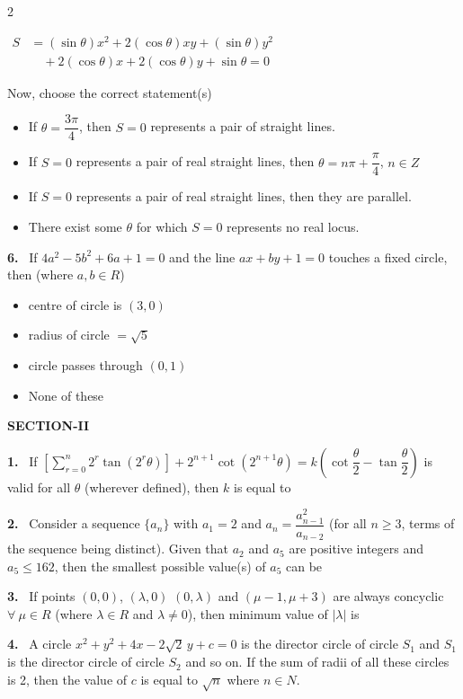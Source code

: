 \documentclass[10pt]{extarticle}
\newcommand{\sect}[1]{\par\smallskip\noindent\textbf{#1}\par}
\newcommand{\qn}[1]{\par\smallskip\noindent\textbf{#1.}~}
\newenvironment{qoptions}{\begin{itemize}[leftmargin=1.8em,itemsep=1pt,topsep=2pt,label={}]}{\end{itemize}}
\newcommand{\opt}[2]{\item[(#1)] #2}
\begin{document}
\begin{multicols}{2}
\par\noindent\hfill$\begin{aligned}S&=(\sin\theta)x^2+2(\cos\theta)xy+(\sin\theta)y^2\\&\quad+2(\cos\theta)x+2(\cos\theta)y+\sin\theta=0\end{aligned}$\hfill\null\par
Now, choose the correct statement(s)
\begin{qoptions}
\opt{A}{If $\theta=\dfrac{3\pi}4$, then $S=0$ represents a pair of straight lines.}
\opt{B}{If $S=0$ represents a pair of real straight lines, then $\theta=n\pi+\dfrac\pi4$, $n\in Z$}
\opt{C}{If $S=0$ represents a pair of real straight lines, then they are parallel.}
\opt{D}{There exist some $\theta$ for which $S=0$ represents no real locus.}
\end{qoptions}
\qn{6} If $4a^2-5b^2+6a+1=0$ and the line $ax+by+1=0$ touches a fixed circle, then (where $a,b\in R$)
\begin{qoptions}
\opt{A}{centre of circle is $(3,0)$}
\opt{B}{radius of circle $=\sqrt5$}
\opt{C}{circle passes through $(0,1)$}
\opt{D}{None of these}
\end{qoptions}
\sect{SECTION-II}
\qn{1} If $\left[\displaystyle\sum_{r=0}^{n}2^r\tan\left(2^r\theta\right)\right]+2^{n+1}\cot\left(2^{n+1}\theta\right)=k\left(\cot\dfrac\theta2-\tan\dfrac\theta2\right)$ is valid for all $\theta$ (wherever defined), then $k$ is equal to
\qn{2} Consider a sequence $\{a_n\}$ with $a_1=2$ and $a_n=\dfrac{a_{n-1}^2}{a_{n-2}}$ (for all $n\ge3$, terms of the sequence being distinct). Given that $a_2$ and $a_5$ are positive integers and $a_5\le162$, then the smallest possible value(s) of $a_5$ can be
\qn{3} If points $(0,0)$, $(\lambda,0)$ $(0,\lambda)$ and $(\mu-1,\mu+3)$ are always concyclic $\forall\ \mu\in R$ (where $\lambda\in R$ and $\lambda\ne0$), then minimum value of $|\lambda|$ is
\qn{4} A circle $x^2+y^2+4x-2\sqrt2\,y+c=0$ is the director circle of circle $S_1$ and $S_1$ is the director circle of circle $S_2$ and so on. If the sum of radii of all these circles is 2, then the value of $c$ is equal to $\sqrt n$ where $n\in N$.


\end{multicols}
\end{document}
